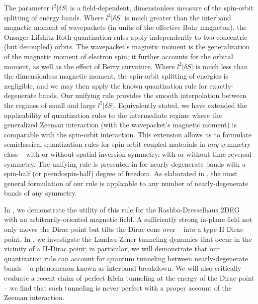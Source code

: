 \documentclass[aps, showpacs, twocolumn, notitlepage, superscriptaddress]{revtex4-1}
\begin{document}
The parameter $l^2|\delta S|$ is a field-dependent, dimensionless measure of the spin-orbit splitting of energy bands. 
Where $l^2|\delta S|$ is much greater than the interband magnetic moment of wavepackets\cite{rothmag} (in units of the effective Bohr magneton), the Onsager-Lifshitz{-Roth} quantization rules apply independently to  two concentric (but decoupled) orbits. The wavepacket's magnetic moment is the generalization of the magnetic moment of electron spin; it further accounts for the orbital moment,\cite{chang_berry_1996} as well as the effect of Berry curvature. Where $l^2|\delta S|$ is much less than the dimensionless magnetic moment, the spin-orbit splitting of energies is negligible, and we may then apply the known quantization rule for exactly-degenerate bands\cite{rotheffham,rothmag,topoferm,100p,mikitik_manifestation_1999}. Our unifying rule provides the smooth interpolation between the regimes of small and large $l^2|\delta S|$. Equivalently stated, we have extended the applicability of quantization rules to the intermediate regime  where the generalized Zeeman interaction (with the wavepacket's magnetic moment) is comparable with the spin-orbit interaction. This extension allows us  to formulate semiclassical quantization rules for spin-orbit coupled materials in \textit{any} symmetry class -- with or without spatial inversion symmetry, with or without time-reversal symmetry. The unifying rule is presented in  for nearly-degenerate bands with a spin-half (or pseudospin-half) degree of freedom. As elaborated in , the most general formulation of our rule is applicable  to any number of nearly-degenerate bands of any symmetry.

In , we demonstrate the utility of this rule for the Rashba{-Dresselhaus} 2DEG with an arbitrarily-oriented magnetic field. A sufficiently strong in-plane field not only moves the Dirac point but tilts the Dirac cone over -- into a type-II\cite{soluyanov_type-ii_2015, muechler_tilted_2016, bergholtz_topology_2015} Dirac point. In , we investigate the Landau-Zener tunneling dynamics that occur in the vicinity of a II-Dirac point; in particular, we will {demonstrate that our quantization rule can account for quantum tunneling between nearly-degenerate bands -- a phenomenon known as interband breakdown\cite{kaganov_coherent_1983,slutskin_dynamics_1968,AALG,100p}. We will also} critically evaluate a recent claim\cite{obrien_magnetic_2016} of perfect Klein tunneling at the energy of the Dirac point -- we find that such tunneling is never perfect with a proper account of the Zeeman interaction.
\end{document}
